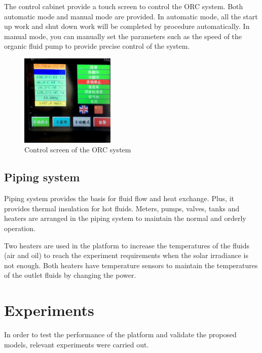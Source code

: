 The control cabinet provide a touch screen to control the ORC system. Both automatic mode and manual mode are provided. In automatic mode, all the start up work and shut down work will be completed by procedure automatically. In manual mode, you can manually set the parameters such as the speed of the organic fluid pump to provide precise control of the system.

\begin{figure}[!ht]
\centering
\includegraphics[width=0.4\textwidth]{fig/ControlCabinet}
\caption{Control screen of the ORC system}\label{fig:ControlCabinet}
\end{figure}

\subsection{Piping system}

Piping system provides the basis for fluid flow and heat exchange. Plus, it provides thermal insulation for hot fluids. Meters, pumps, valves, tanks and heaters are arranged in the piping system to maintain the normal and orderly operation.

Two heaters are used in the platform to increase the temperatures of the fluids (air and oil) to reach the experiment requirements when the solar irradiance is not enough. Both heaters have temperature sensors to maintain the temperatures of the outlet fluids by changing the power.
 


\section{Experiments}

In order to test the performance of the platform and validate the proposed models, relevant experiments were carried out.
